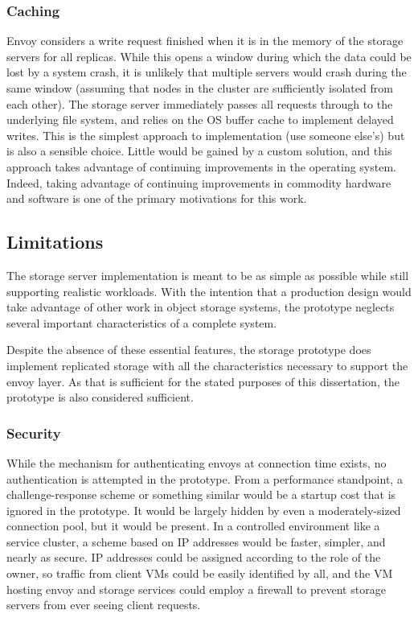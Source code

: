 \subsubsection{Caching}

Envoy considers a write request finished when it is in the memory of the storage servers for all replicas. While this opens a window during which the data could be lost by a system crash, it is unlikely that multiple servers would crash during the same window (assuming that nodes in the cluster are sufficiently isolated from each other). The storage server immediately passes all requests through to the underlying file system, and relies on the OS buffer cache to implement delayed writes. This is the simplest approach to implementation (use someone else's) but is also a sensible choice. Little would be gained by a custom solution, and this approach takes advantage of continuing improvements in the operating system. Indeed, taking advantage of continuing improvements in commodity hardware and software is one of the primary motivations for this work.

\subsection{Limitations}

The storage server implementation is meant to be as simple as possible while still supporting realistic workloads. With the intention that a production design would take advantage of other work in object storage systems, the prototype neglects several important characteristics of a complete system.

Despite the absence of these essential features, the storage prototype does implement replicated storage with all the characteristics necessary to support the envoy layer. As that is sufficient for the stated purposes of this dissertation, the prototype is also considered sufficient.

\subsubsection{Security}

While the mechanism for authenticating envoys at connection time exists, no authentication is attempted in the prototype. From a performance standpoint, a challenge-response scheme or something similar would be a startup cost that is ignored in the prototype. It would be largely hidden by even a moderately-sized connection pool, but it would be present. In a controlled environment like a service cluster, a scheme based on IP addresses would be faster, simpler, and nearly as secure. IP addresses could be assigned according to the role of the owner, so traffic from client VMs could be easily identified by all, and the VM hosting envoy and storage services could employ a firewall to prevent storage servers from ever seeing client requests.

